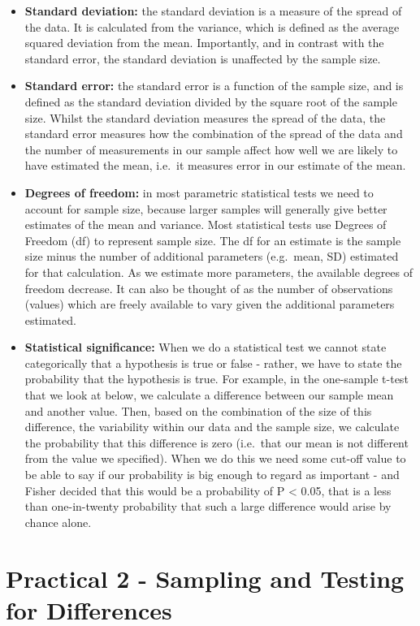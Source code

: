 \documentclass[
]{book}
\begin{document}
\begin{itemize}
\item
  \textbf{Standard deviation:} the standard deviation is a measure of the spread of the data. It is calculated from the variance, which is defined as the average squared deviation from the mean. Importantly, and in contrast with the standard error, the standard deviation is unaffected by the sample size.
\item
  \textbf{Standard error:} the standard error is a function of the sample size, and is defined as the standard deviation divided by the square root of the sample size. Whilst the standard deviation measures the spread of the data, the standard error measures how the combination of the spread of the data and the number of measurements in our sample affect how well we are likely to have estimated the mean, i.e.~it measures error in our estimate of the mean.
\item
  \textbf{Degrees of freedom:} in most parametric statistical tests we need to account for sample size, because larger samples will generally give better estimates of the mean and variance. Most statistical tests use Degrees of Freedom (df) to represent sample size. The df for an estimate is the sample size minus the number of additional parameters (e.g.~mean, SD) estimated for that calculation. As we estimate more parameters, the available degrees of freedom decrease. It can also be thought of as the number of observations (values) which are freely available to vary given the additional parameters estimated.
\item
  \textbf{Statistical significance:} When we do a statistical test we cannot state categorically that a hypothesis is true or false - rather, we have to state the probability that the hypothesis is true. For example, in the one-sample t-test that we look at below, we calculate a difference between our sample mean and another value. Then, based on the combination of the size of this difference, the variability within our data and the sample size, we calculate the probability that this difference is zero (i.e.~that our mean is not different from the value we specified). When we do this we need some cut-off value to be able to say if our probability is big enough to regard as important - and Fisher decided that this would be a probability of P \textless{} 0.05, that is a less than one-in-twenty probability that such a large difference would arise by chance alone.
\end{itemize}

\hypertarget{practical-2---sampling-and-testing-for-differences}{%
\section{Practical 2 - Sampling and Testing for Differences}\label{practical-2---sampling-and-testing-for-differences}}
\end{document}

